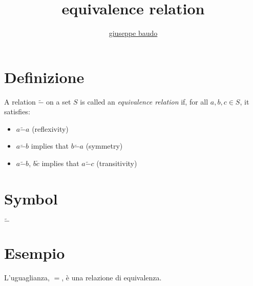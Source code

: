 \documentclass[a4paper,10pt]{article}
\title{equivalence relation}
\author{\href{http://www.baudo.hol.es}{giuseppe baudo}}
\begin{document}
\maketitle

\section{Definizione}
A relation $\tilde{-}$ on a set $S$ is called an \textit{equivalence relation} if, for all $a, b, c \in S$, it satisfies:
\begin{itemize}
 \item $a \tilde{-} a$ (reflexivity)
 \item $a \tilde{-} b$ implies that $b \tilde{-} a$ (symmetry)
 \item $a \tilde{-} b$, $b \tilde c$ implies that $a \tilde{-} c$ (transitivity)
\end{itemize}

\section{Symbol}
$\tilde{-}$



\section{Esempio}
L'uguaglianza, $=$, è una relazione di equivalenza.
\end{document}
